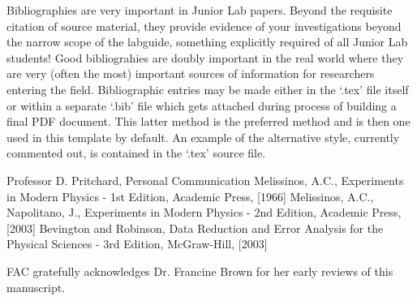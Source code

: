 \documentclass[aps,twocolumn,secnumarabic,nobalancelastpage,amsmath,amssymb,nofootinbib]{revtex4}
\begin{document}
Bibliographies are very important in Junior Lab papers.  Beyond the
requisite citation of source material, they provide evidence of your
investigations beyond the narrow scope of the labguide, something
explicitly required of all Junior Lab students!  Good bibliograhies
are doubly important in the real world where they are very (often
the most) important sources of information for researchers entering
the field.  Bibliographic entries may be made either in the `.tex'
file itself or within a separate `.bib' file which gets attached
during process of building a final PDF document.  This latter method
is the preferred method and is then one used in this template by
default.  An example of the alternative style, currently commented
out,  is contained in the `.tex' source file.





\begin{thebibliography}{99}
Professor D. Pritchard, Personal Communication
Melissinos, A.C., Experiments in Modern
  Physics - 1st Edition, Academic Press,  [1966]
Melissinos, A.C., Napolitano, J.,  Experiments in Modern
  Physics - 2nd Edition, Academic Press,  [2003]
Bevington and Robinson, Data Reduction and
  Error Analysis for the Physical Sciences - 3rd Edition, McGraw-Hill,
  [2003]

\end{thebibliography}


\begin{acknowledgments} FAC gratefully acknowledges Dr. Francine Brown for
her early reviews of this manuscript.
\end{acknowledgments}

\end{document}
